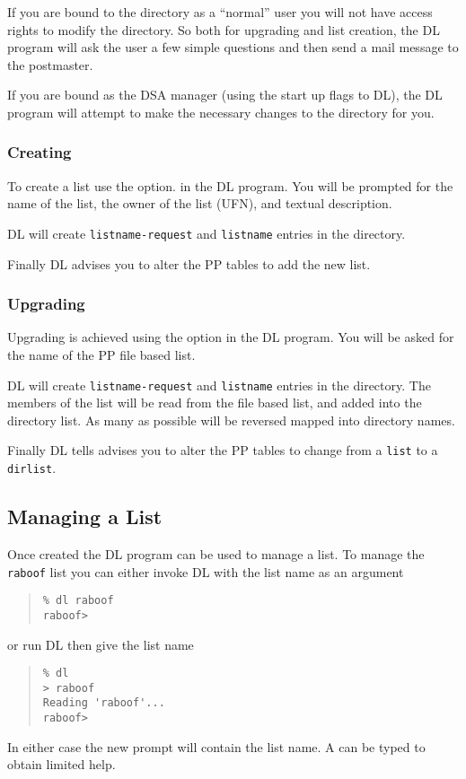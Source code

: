 If you are bound to the directory as a ``normal'' user you will not
have access rights to modify the directory.  So both for upgrading and
list creation, the DL program will ask the user a few simple questions
and then send a mail message to the postmaster.

If you are bound as the DSA manager (using the  start up
flags to DL), the DL program will attempt to make the necessary
changes to the directory for you.

\subsubsection{Creating}

To create a list use the  option. in the DL program.  You
will be prompted for the name of the list, the owner of the list
(UFN), and textual description.

DL will create \verb+listname-request+ and \verb+listname+ 
entries in the directory.

Finally DL advises you to alter the PP tables to add 
the new list.

\subsubsection{Upgrading}

Upgrading is achieved using the  option in the DL program.
You will be asked for
the name of the PP file based list.

DL will create \verb+listname-request+ and \verb+listname+ 
entries in the directory.
The members of the list will be read from the file based list, and
added into the directory list.  As many as possible will be reversed
mapped into directory names.

Finally DL tells advises you to alter the PP tables to change from a
\verb+list+ to a \verb+dirlist+.


\subsection{Managing a List}\label{DL:1list}

Once created the DL program can be used to manage a list.  
To manage the \verb+raboof+ list you can either invoke DL with the list name
as an argument
\begin{quote}\begin{verbatim}
% dl raboof
raboof>
\end{verbatim}\end{quote}
or run DL then give the list name 
\begin{quote}\begin{verbatim}
% dl 
> raboof
Reading 'raboof'...
raboof> 
\end{verbatim}\end{quote}
In either case the new prompt will contain the list name.
A  can be typed to obtain limited help.

